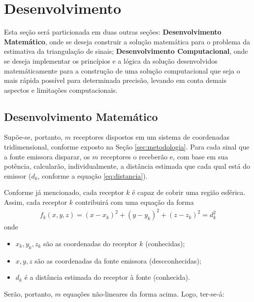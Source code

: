 	\section{Desenvolvimento}
	\label{sec:dev}
	Esta seção será particionada em duas outras seções: \textbf{Desenvolvimento Matemático}, onde
	se deseja construir a solução matemática para o problema da estimativa da triangulação de sinais;
	\textbf{Desenvolvimento Computacional}, onde se deseja implementar os princípios e a lógica da
	solução desenvolvidos matemáticamente para a construção de uma solução computacional que seja
	o mais rápida possível para determinada precisão, levando em conta demais aspectos e
	limitações computacionais.

	\subsection{Desenvolvimento Matemático}
	\label{sec:dev_math}
	Supõe-se, portanto, $m$ receptores dispostos em um sistema de coordenadas tridimensional, conforme
	exposto na Seção \ref{sec:metodologia}. Para cada sinal que a fonte emissora disparar, os $m$
	receptores o receberão e, com base em sua potência, calcularão, individualmente, a distância
	estimada que cada qual está do emissor ($d_k$, conforme a equação \ref{eq:distancia}).

	Conforme já mencionado, cada receptor $k$ é capaz de cobrir uma região esférica.
	Assim, cada receptor $k$ contribuirá com uma equação da forma
	\begin{align}
		f_k(x,y,z) = (x - x_k)^2 + (y - y_k)^2 + (z - z_k)^2 = d_k^2 \label{eq:receptor}
	\end{align}
	onde
	\begin{itemize}
		\item $x_k, y_k, z_k$ são as coordenadas do receptor $k$ (conhecidas);
		\item $x, y, z$ são as coordenadas da fonte emissora (descconhecidas);
		\item $d_k$ é a distância estimada do receptor à fonte (conhecida).
	\end{itemize}

	Serão, portanto, $m$ equações não-lineares da forma acima. Logo, ter-se-á:

